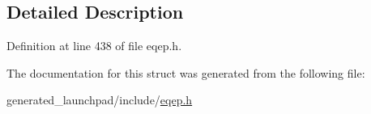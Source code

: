 \subsection{Detailed Description}


Definition at line 438 of file eqep.\+h.



The documentation for this struct was generated from the following file\+:\begin{DoxyCompactItemize}
\item 
generated\+\_\+launchpad/include/\mbox{\hyperlink{eqep_8h}{eqep.\+h}}\end{DoxyCompactItemize}
